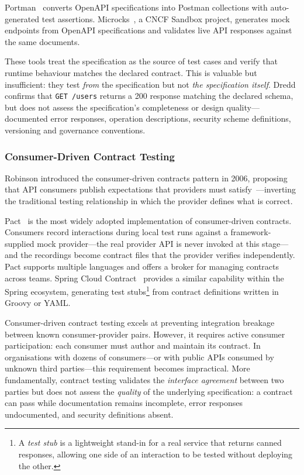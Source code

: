 Portman~\cite{portman} converts OpenAPI specifications into Postman collections with auto-generated test assertions. Microcks~\cite{microcks}, a CNCF Sandbox project, generates mock endpoints from OpenAPI specifications and validates live API responses against the same documents.

These tools treat the specification as the source of test cases and verify that runtime behaviour matches the declared contract. This is valuable but insufficient: they test \textit{from} the specification but not \textit{the specification itself}. Dredd confirms that \texttt{GET /users} returns a 200 response matching the declared schema, but does not assess the specification's completeness or design quality---documented error responses, operation descriptions, security scheme definitions, versioning and governance conventions.

\subsubsection{Consumer-Driven Contract Testing}

Robinson introduced the consumer-driven contracts pattern in 2006, proposing that API consumers publish expectations that providers must satisfy~\cite{consumer-driven-contracts}---inverting the traditional testing relationship in which the provider defines what is correct.

Pact~\cite{pact} is the most widely adopted implementation of consumer-driven contracts. Consumers record interactions during local test runs against a framework-supplied mock provider---the real provider API is never invoked at this stage---and the recordings become contract files that the provider verifies independently. Pact supports multiple languages and offers a broker for managing contracts across teams. Spring Cloud Contract~\cite{spring-cloud-contract} provides a similar capability within the Spring ecosystem, generating test stubs\footnote{A \emph{test stub} is a lightweight stand-in for a real service that returns canned responses, allowing one side of an interaction to be tested without deploying the other.} from contract definitions written in Groovy or YAML.

Consumer-driven contract testing excels at preventing integration breakage between known consumer-provider pairs. However, it requires active consumer participation: each consumer must author and maintain its contract. In organisations with dozens of consumers---or with public APIs consumed by unknown third parties---this requirement becomes impractical. More fundamentally, contract testing validates the \textit{interface agreement} between two parties but does not assess the \textit{quality} of the underlying specification: a contract can pass while documentation remains incomplete, error responses undocumented, and security definitions absent.

